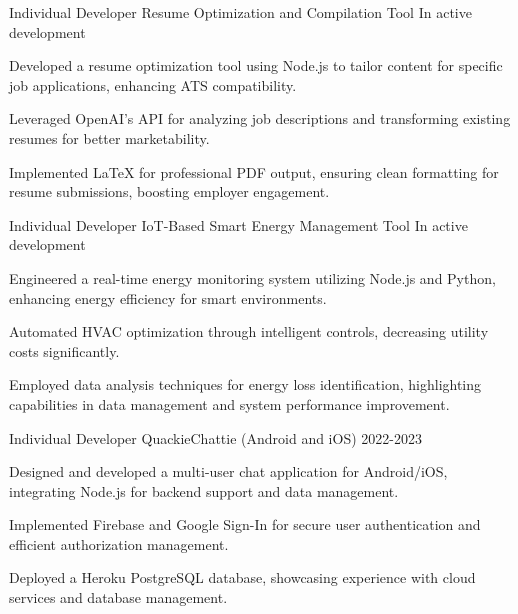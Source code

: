 
\begin{cventries}

        \cventry
          {Individual Developer} %
          {Resume Optimization and Compilation Tool} %
          {} %
          {In active development} %
          {
            \begin{cvitems} %
            \item {Developed a resume optimization tool using Node.js to tailor content for specific job applications, enhancing ATS compatibility.}
    \item {Leveraged OpenAI's API for analyzing job descriptions and transforming existing resumes for better marketability.}
    \item {Implemented LaTeX for professional PDF output, ensuring clean formatting for resume submissions, boosting employer engagement.}
            \end{cvitems}
          }

        \cventry
          {Individual Developer} %
          {IoT-Based Smart Energy Management Tool} %
          {} %
          {In active development} %
          {
            \begin{cvitems} %
            \item {Engineered a real-time energy monitoring system utilizing Node.js and Python, enhancing energy efficiency for smart environments.}
    \item {Automated HVAC optimization through intelligent controls, decreasing utility costs significantly.}
    \item {Employed data analysis techniques for energy loss identification, highlighting capabilities in data management and system performance improvement.}
            \end{cvitems}
          }

        \cventry
          {Individual Developer} %
          {QuackieChattie (Android and iOS)} %
          {} %
          {2022-2023} %
          {
            \begin{cvitems} %
            \item {Designed and developed a multi-user chat application for Android/iOS, integrating Node.js for backend support and data management.}
    \item {Implemented Firebase and Google Sign-In for secure user authentication and efficient authorization management.}
    \item {Deployed a Heroku PostgreSQL database, showcasing experience with cloud services and database management.}
            \end{cvitems}
          }


\end{cventries}

